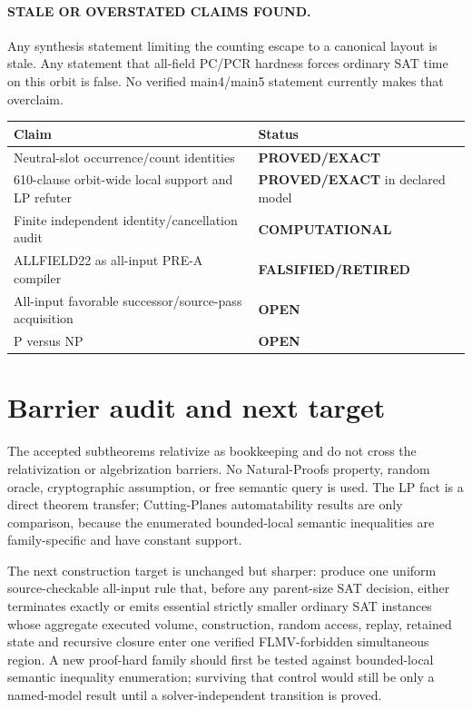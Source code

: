 \documentclass[11pt]{article}
\newcommand{\OPEN}{\textbf{OPEN}}
\newcommand{\EXACT}{\textbf{PROVED/EXACT}}
\newcommand{\COMP}{\textbf{COMPUTATIONAL}}
\newcommand{\RET}{\textbf{FALSIFIED/RETIRED}}
\begin{document}
\paragraph{STALE OR OVERSTATED CLAIMS FOUND.}
Any synthesis statement limiting the counting escape to a canonical layout
is stale.  Any statement that all-field PC/PCR hardness forces ordinary SAT
time on this orbit is false.  No verified main4/main5 statement currently
makes that overclaim.

\begin{center}\begin{tabularx}{0.96\linewidth}{@{}lX@{}}\toprule
Claim & Status\\\midrule
Neutral-slot occurrence/count identities & \EXACT\\
610-clause orbit-wide local support and LP refuter & \EXACT{} in declared model\\
Finite independent identity/cancellation audit & \COMP\\
ALLFIELD22 as all-input PRE-A compiler & \RET\\
All-input favorable successor/source-pass acquisition & \OPEN\\
P versus NP & \OPEN\\\bottomrule
\end{tabularx}\end{center}

\section{Barrier audit and next target}
The accepted subtheorems relativize as bookkeeping and do not cross the
relativization or algebrization barriers.  No Natural-Proofs property, random
oracle, cryptographic assumption, or free semantic query is used.  The LP
fact is a direct theorem transfer; Cutting-Planes automatability results are
only comparison, because the enumerated bounded-local semantic inequalities
are family-specific and have constant support.

The next construction target is unchanged but sharper: produce one uniform
source-checkable all-input rule that, before any parent-size SAT decision,
either terminates exactly or emits essential strictly smaller ordinary SAT
instances whose aggregate executed volume, construction, random access,
replay, retained state and recursive closure enter one verified FLMV-forbidden
simultaneous region.  A new proof-hard family should first be tested against
bounded-local semantic inequality enumeration; surviving that control would
still be only a named-model result until a solver-independent transition is
proved.
\end{document}
